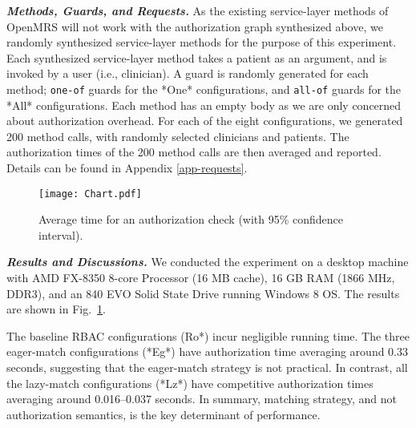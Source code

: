 \documentclass{acm_proc_article-sp}
\newcommand{\textcode}[1]{\texttt{#1}}
\begin{document}
\textit{\textbf{Methods, Guards, and Requests.}}  As the existing
service-layer methods of OpenMRS will not work with the authorization
graph synthesized above, we randomly synthesized service-layer methods
for the purpose of this experiment.  Each synthesized service-layer
method takes a patient as an argument, and is invoked by a user (i.e.,
clinician).  A guard is randomly generated for each method;
\textcode{one-of} guards for the *\textsf{One}* configurations, and
\textcode{all-of} guards for the *\textsf{All}* configurations.  Each
method has an empty body as we are only concerned about authorization
overhead.  For each of the eight configurations, we generated 200
method calls, with randomly selected clinicians and patients.  The
authorization times of the 200 method calls are then averaged and
reported.  Details can be found in Appendix \ref{app-requests}.









\begin{figure}
\centering
\texttt{[image: Chart.pdf]}
\caption{\label{fig-time}Average time for an authorization check (with
  95\% confidence interval).}
\end{figure}

\textit{\textbf{Results and Discussions.}}  We conducted the
experiment on a desktop machine
with AMD
FX-8350 8-core Processor (16 MB cache), 16 GB RAM (1866 MHz, DDR3),
and an 840 EVO Solid State Drive running Windows 8 OS. The results are shown in
Fig.~\ref{fig-time}.




The baseline RBAC configurations (\textsf{Ro}*) incur negligible
running time.  The three eager-match configurations (*\textsf{Eg}*)
have authorization time averaging around 0.33 seconds, suggesting that
the eager-match strategy is not practical.  In contrast, all the
lazy-match configurations (*\textsf{Lz}*) have competitive
authorization times averaging around 0.016--0.037 seconds.  In
summary, matching strategy, and not authorization semantics,
is the key determinant of performance.

\begin{comment}
\textsf{ReOneLz} incur
negligible authorization time because \textcode{one-of} guards are
inherently much easier to verify than \textcode{all-of} guards.
\textsf{ReAllLzLib} and \textsf{ReAllLzStr} both have authorization
time of around 0.1 second, with the strict-grant semantics having a
slight performance advantage over liberal grant.
\end{comment}
\end{document}
